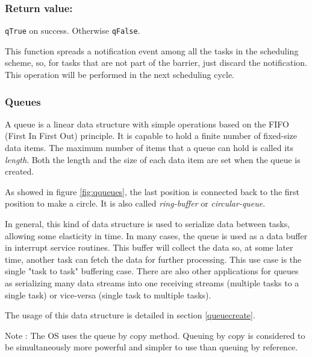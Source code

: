 \subsubsection*{Return value:}

\lstinline{qTrue} on success. Otherwise \lstinline{qFalse}.

\noindent\hrulefill
\medskip

\begin{tcolorbox}
\HandRight This function spreads a notification event among all the tasks in the scheduling scheme, so,  for tasks that are not part of the barrier, just discard the notification. This operation will be performed in the next scheduling cycle.
\end{tcolorbox}

\subsubsection{Queues}
A queue is a linear data structure with simple operations based on the FIFO (First In First Out) principle. It is capable to hold a finite number of fixed-size data items. The maximum number of items that a queue can hold is called its \textit{length}. Both the length and the size of each data item are set when the queue is created.

As showed in figure \ref{fig:qqueues}, the last position is connected back to the first position to make a circle. It is also called \textit{ring-buffer} or \textit{circular-queue}. 

In general, this kind of data structure is used to serialize data between tasks, allowing some elasticity in time. In many cases, the queue is used as a data buffer in interrupt service routines. This buffer will collect the data so, at some later time, another task can fetch the data for further processing. This use case is the single "task to task" buffering case. There are also other applications for queues as serializing  many data streams into one receiving streams (multiple tasks to a single task) or vice-versa (single task to multiple tasks).



The usage of this data structure is detailed in section \ref{queuecreate}.
\medskip
\begin{tcolorbox}
\ArrowBoldDownRight Note : The OS uses the queue by copy method. Queuing by copy is considered to be simultaneously more powerful and simpler to use than queuing by reference.
\end{tcolorbox}

